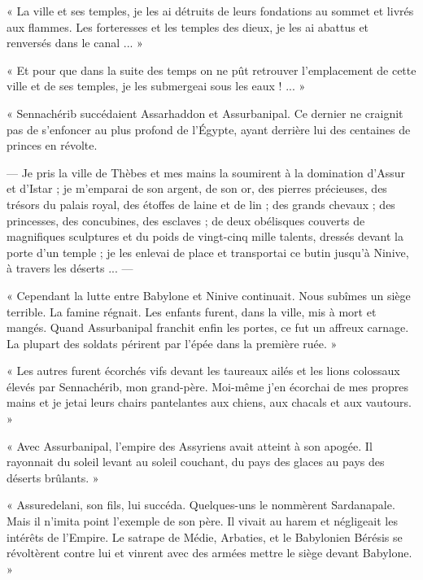 \documentclass[a4paper, 11pt, oneside, polutonikogreek, french]{article}
\begin{document}
« La ville et ses temples, je les ai détruits de leurs fondations au sommet et livrés aux flammes. Les forteresses et les temples des dieux, je les ai abattus et renversés dans le canal ... »

« Et pour que dans la suite des temps on ne pût retrouver l'emplacement de cette ville et de ses temples, je les submergeai sous les eaux ! ... »

\bigskip
\centerline{\EightStarTaper}
\centerline{\EightStarTaper\EightStarTaper}
\bigskip

« Sennachérib succédaient Assarhaddon et Assurbanipal. Ce dernier ne craignit pas de s'enfoncer au plus profond de l'Égypte, ayant derrière lui des centaines de princes en révolte.

--- Je pris la ville de Thèbes et mes mains la soumirent à la domination d'Assur et d'Istar ; je m'emparai de son argent, de son or, des pierres précieuses, des trésors du palais royal, des étoffes de laine et de lin ; des grands chevaux ; des princesses, des concubines, des esclaves ; de deux obélisques couverts de magnifiques sculptures et du poids de vingt-cinq mille talents, dressés devant la porte d'un temple ; je les enlevai de place et transportai ce butin jusqu'à Ninive, à travers les déserts ... ---

« Cependant la lutte entre Babylone et Ninive continuait. Nous subîmes un siège terrible. La famine régnait. Les enfants furent, dans la ville, mis à mort et mangés. Quand Assurbanipal franchit enfin les portes, ce fut un affreux carnage. La plupart des soldats périrent par l'épée dans la première ruée. »

« Les autres furent écorchés vifs devant les taureaux ailés et les lions colossaux élevés par Sennachérib, mon grand-père. Moi-même j'en écorchai de mes propres mains et je jetai leurs chairs pantelantes aux chiens, aux chacals et aux vautours. »

\bigskip
\centerline{\EightStarTaper}
\centerline{\EightStarTaper\EightStarTaper}
\bigskip

« Avec Assurbanipal, l'empire des Assyriens avait atteint à son apogée. Il rayonnait du soleil levant au soleil couchant, du pays des glaces au pays des déserts brûlants. »

« Assuredelani, son fils, lui succéda. Quelques-uns le nommèrent Sardanapale. Mais il n'imita point l'exemple de son père. Il vivait au harem et négligeait les intérêts de l'Empire. Le satrape de Médie, Arbaties, et le Babylonien Bérésis se révoltèrent contre lui et vinrent avec des armées mettre le siège devant Babylone. »
\end{document}
